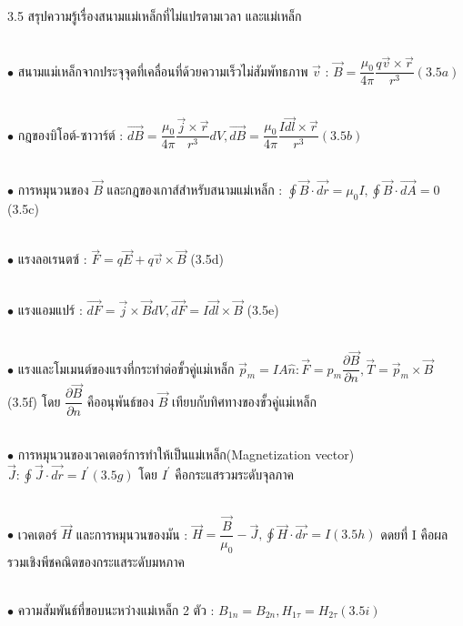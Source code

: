 \documentclass[a4paper,12pt]{article}
\begin{document}
3.5 สรุปความรู้เรื่องสนามแม่เหล็กที่ไม่แปรตามเวลา และแม่เหล็ก

~\\ $\bullet$ สนามแม่เหล็กจากประจุจุดที่เคลื่อนที่ด้วยความเร็วไม่สัมพัทธภาพ  $\vec{v}$  :
$\vec{B} = \dfrac{\mu_{0}}{4\pi}\dfrac{q\vec{v}\times\vec{r}}{r^{3}}                          (3.5a)$

~\\ $\bullet$ กฎของบิโอต์-ซาวาร์ต์ :
$\vec{dB} = \dfrac{\mu_{0}}{4\pi}\dfrac{\vec{j}\times\vec{r}}{r^{3}}dV  ,         \vec{dB} = \dfrac{\mu_{0}}{4\pi}\dfrac{I\vec{dl}\times\vec{r}}{r^{3}}                          (3.5b)$

~\\ $\bullet$ การหมุนวนของ $\vec{B}$ และกฎของเกาส์สำหรับสนามแม่เหล็ก :
$\displaystyle \oint \vec{B}\cdot\vec{dr} = \mu_{0}I ,            \displaystyle \oint \vec{B}\cdot\vec{dA} = 0$                               (3.5c)

~\\ $\bullet$ แรงลอเรนตซ์ :
$\vec{F} = q\vec{E} + q\vec{v}\times\vec{B}$                                       (3.5d)

~\\ $\bullet$ แรงแอมแปร์ :
$\vec{dF} = \vec{j}\times\vec{B} dV ,                 \vec{dF} = I\vec{dl}\times\vec{B}$                       (3.5e)

~\\ $\bullet$ แรงและโมเมนต์ของแรงที่กระทำต่อขั้วคู่แม่เหล็ก $\vec{p}_{m} = IA\hat{n} :
\vec{F}= p_{m}\dfrac{\partial \vec{B}}{\partial n} ,        \vec{T} = \vec{p}_{m}\times\vec{B}$               (3.5f)
โดย $\dfrac{\partial \vec{B}}{\partial n}$ คืออนุพันธ์ของ $\vec{B}$ เทียบกับทิศทางของขั้วคู่แม่เหล็ก

~\\ $\bullet$ การหมุนวนของเวคเตอร์การทำให้เป็นแม่เหล็ก(Magnetization vector)$\vec{J} :
\displaystyle \oint \vec{J}\cdot\vec{dr} = I^\prime                                    (3.5g)$
โดย  $I^\prime$ คือกระแสรวมระดับจุลภาค

~\\ $\bullet$ เวคเตอร์ $\vec{H}$ และการหมุนวนของมัน :
$\vec{H} = \dfrac{\vec{B}}{\mu_{0}} - \vec{J} ,          \displaystyle \oint \vec{H}\cdot\vec{dr} = I                                  (3.5h)$
ดดยที่ I คือผลรวมเชิงพีชคณิตของกระแสระดับมหภาค

~\\ $\bullet$ ความสัมพันธ์ที่ขอบนะหว่างแม่เหล็ก 2 ตัว :
$B_{1n} = B_{2n} ,                H_{1\tau} = H_{2\tau}                                             (3.5i)$
\end{document}
